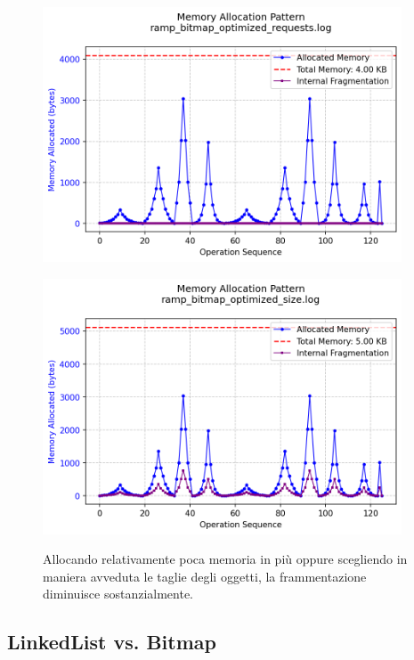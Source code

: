 \begin{figure}[H]
  \centering
  \begin{minipage}{0.48\textwidth}
    \centering
    \includegraphics[width=0.95\textwidth]{graphs/ramp_bitmap_optimized_requests.png}
    \label{fig:ramp_bitmap_optimized_requests}
  \end{minipage}\hfill
  \begin{minipage}{0.48\textwidth}
    \centering
    \includegraphics[width=0.95\textwidth]{graphs/ramp_bitmap_optimized_size.png}
    \label{fig:ramp_bitmap_optimized_size}
  \end{minipage}
  \caption{Allocando relativamente poca memoria in più oppure scegliendo in maniera avveduta le taglie degli oggetti, la frammentazione diminuisce sostanzialmente.}
\end{figure}


\subsection{LinkedList vs. Bitmap}


